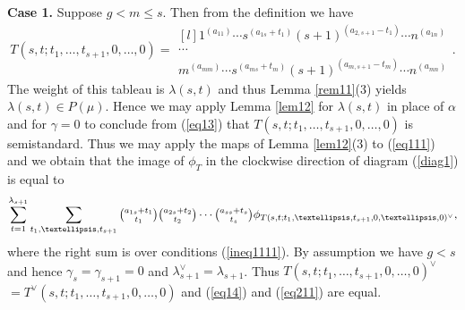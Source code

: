 \documentclass[11pt]{article}
\theoremstyle{definition}
\numberwithin{equation}{section}
\newcommand{\al}{\alpha}
\newcommand{\la}{\lambda}
\numberwithin{equation}{section}
\begin{document}
\textbf{Case 1.} Suppose $g<m \le s$. Then from the definition we have \begin{equation}\label{eq13}T(s,t;t_1,\dots,t_{s+1},0,\dots,0)=\begin{matrix*}[l]
		1^{(a_{11})} \cdots s^{(a_{1s}+t_1)}(s+1)^{(a_{2,s+1}-t_1)} \cdots n^{(a_{1n})} \\
		\cdots \\ 
		m^{(a_{mm})}\cdots s^{(a_{ms}+t_m)}(s+1)^{(a_{m,s+1}-t_m)} \cdots n^{(a_{mn})}   \end{matrix*}.\end{equation}
The weight of this tableau is $\la(s,t)$ and thus Lemma \ref{rem11}(3) yields $\la(s,t) \in P(\mu)$. Hence we may apply Lemma \ref{lem12} for $\la(s,t)$ in place of $\al$ and for $\gamma=0$ to conclude from (\ref{eq13}) that $T(s,t;t_1,\dots,t_{s+1},0,\dots,0)$ is semistandard. Thus we may apply the maps of Lemma \ref{lem12}(3) to  (\ref{eq111}) and we obtain that the image of $\phi_T$  in the clockwise direction of diagram (\ref{diag1}) is equal to 
\begin{equation}\label{eq14}
	\sum_{t=1}^{\lambda_{s+1}}\sum_{t_1,\dots,t_{s+1}}\tbinom{a_{1s}+t_1}{t_1}\tbinom{a_{2s}+t_2}{t_2} \cdots \tbinom{a_{ss}+t_s}{t_s}\phi_{T(s,t;t_1,\dots,t_{s+1},0,\dots,0)^{\vee}},\end{equation}
where the right sum is over conditions (\ref{ineq1111}).
By assumption we have $g < s$ and hence $\gamma_s=\gamma_{s+1}=0 $ and $\la^{\vee}_{s+1}=\la_{s+1}$. Thus $T(s,t;t_1,\dots,t_{s+1},0,\dots,0)^{\vee}$ $=T^{\vee}(s,t;t_1,\dots,t_{s+1},0,\dots,0)$ and (\ref{eq14}) and (\ref{eq211}) are equal.
\end{document}
